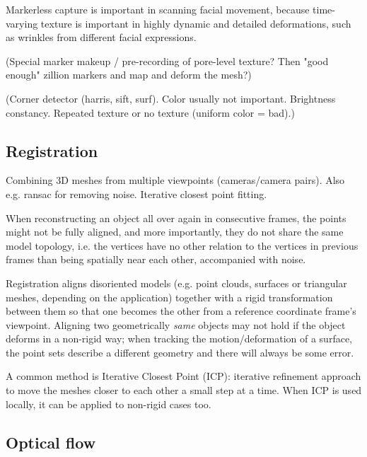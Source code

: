 
Markerless capture is important in scanning facial movement, because time-varying texture is important in highly dynamic and detailed deformations, such as wrinkles from different facial expressions.

(Special marker makeup / pre-recording of pore-level texture? Then "good enough" zillion markers and map and deform the mesh?)


(Corner detector (harris, sift, surf). Color usually not important. Brightness constancy. Repeated texture or no texture (uniform color = bad).)


\subsection{Registration} %

Combining 3D meshes from multiple viewpoints (cameras/camera pairs). Also e.g. ransac for removing noise. Iterative closest point fitting.


When reconstructing an object all over again in consecutive frames, the points might not be fully aligned, and more importantly, they do not share the same model topology, i.e. the vertices have no other relation to the vertices in previous frames than being spatially near each other, accompanied with noise. \cite{zhao2005alignment}

Registration aligns disoriented models (e.g. point clouds, surfaces or triangular meshes, depending on the application) together with a rigid transformation between them so that one becomes the other from a reference coordinate frame's viewpoint.
Aligning two geometrically \textit{same} objects may not hold if the object deforms in a non-rigid way; when tracking the motion/deformation of a surface, the point sets describe a different geometry and there will always be some error.

A common method is Iterative Closest Point (ICP): iterative refinement approach to move the meshes closer to each other a small step at a time.
When ICP is used locally, it can be applied to non-rigid cases too. \cite{brown2007global}


\subsection{Optical flow} %

